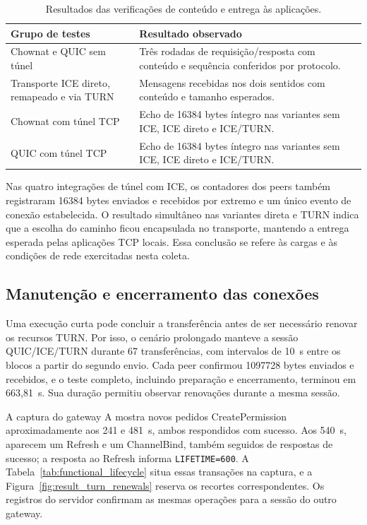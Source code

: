 \begin{table}[htbp]
    \centering
    \small
    \caption{Resultados das verificações de conteúdo e entrega às aplicações.}
    \label{tab:functional_transfer}
    \begin{tabular}{@{}p{}p{}@{}}
        \toprule
        \textbf{Grupo de testes} & \textbf{Resultado observado} \\
        \midrule
        Chownat e QUIC sem túnel & Três rodadas de requisição/resposta com conteúdo e sequência conferidos por protocolo. \\
        Transporte ICE direto, remapeado e via TURN & Mensagens recebidas nos dois sentidos com conteúdo e tamanho esperados. \\
        Chownat com túnel TCP & Echo de 16384 bytes íntegro nas variantes sem ICE, ICE direto e ICE/TURN. \\
        QUIC com túnel TCP & Echo de 16384 bytes íntegro nas variantes sem ICE, ICE direto e ICE/TURN. \\
        \bottomrule
    \end{tabular}
\end{table}

Nas quatro integrações de túnel com ICE, os contadores dos peers
também registraram 16384 bytes enviados e recebidos por extremo e
um único evento de conexão estabelecida. O resultado simultâneo
nas variantes direta e TURN indica que a escolha do caminho ficou
encapsulada no transporte, mantendo a entrega esperada pelas
aplicações TCP locais. Essa conclusão se refere às cargas e às
condições de rede exercitadas nesta coleta.

\subsection{Manutenção e encerramento das conexões}
\label{sec:functional_maintenance_shutdown}

Uma execução curta pode concluir a transferência antes de ser
necessário renovar os recursos TURN. Por isso, o cenário prolongado
manteve a sessão QUIC/ICE/TURN durante 67 transferências, com
intervalos de 10~s entre os blocos a partir do segundo envio.
Cada peer confirmou 1097728 bytes enviados e recebidos, e o teste
completo, incluindo preparação e encerramento, terminou em 663,81~s.
Sua duração permitiu observar renovações durante a mesma sessão.

A captura do gateway A mostra novos pedidos CreatePermission
aproximadamente aos 241 e 481~s, ambos respondidos com sucesso.
Aos 540~s, aparecem um Refresh e um ChannelBind, também seguidos
de respostas de sucesso; a resposta ao Refresh informa
\texttt{LIFETIME=600}. A
Tabela~\ref{tab:functional_lifecycle} situa essas transações na
captura, e a Figura~\ref{fig:result_turn_renewals} reserva os
recortes correspondentes. Os registros do servidor confirmam
as mesmas operações para a sessão do outro gateway.

